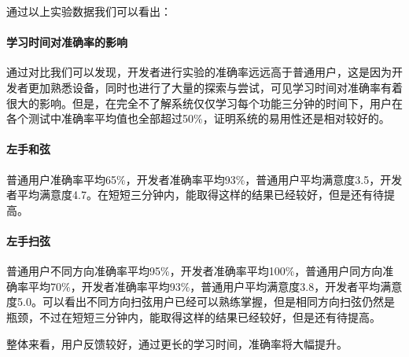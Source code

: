         通过以上实验数据我们可以看出：

        \paragraph{学习时间对准确率的影响} 通过对比我们可以发现，开发者进行实验的准确率远远高于普通用户，这是因为开发者更加熟悉设备，同时也进行了大量的探索与尝试，可见学习时间对准确率有着很大的影响。但是，在完全不了解系统仅仅学习每个功能三分钟的时间下，用户在各个测试中准确率平均值也全部超过50\%，证明系统的易用性还是相对较好的。

        \paragraph{左手和弦} 普通用户准确率平均65\%，开发者准确率平均93\%，普通用户平均满意度3.5，开发者平均满意度4.7。在短短三分钟内，能取得这样的结果已经较好，但是还有待提高。

        \paragraph{左手扫弦} 普通用户不同方向准确率平均95\%，开发者准确率平均100\%，普通用户同方向准确率平均70\%，开发者准确率平均93\%，普通用户平均满意度3.8，开发者平均满意度5.0。可以看出不同方向扫弦用户已经可以熟练掌握，但是相同方向扫弦仍然是瓶颈，不过在短短三分钟内，能取得这样的结果已经较好，但是还有待提高。

        整体来看，用户反馈较好，通过更长的学习时间，准确率将大幅提升。

